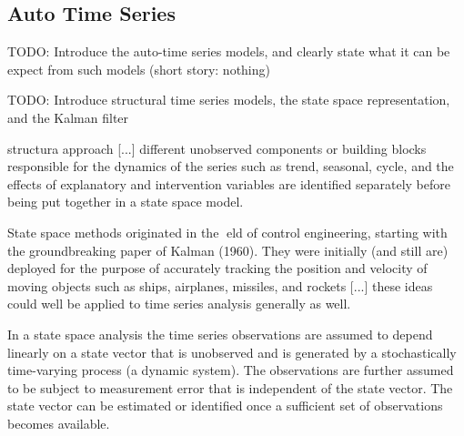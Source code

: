 
\subsection{Auto Time Series}

{\color{red} TODO: Introduce the auto-time series models, and clearly state what it can be expect from such models (short story: nothing)}

{\color{red} TODO: Introduce structural time series models, the state space representation, and the Kalman filter}

{\color{red} structura approach [...] different unobserved components or building blocks responsible for the dynamics of the series such as trend, seasonal, cycle, and the effects of explanatory and intervention variables are identified separately before being put together in a state space model.}

{\color{red} State space methods originated in the eld of control engineering, starting with the groundbreaking
paper of Kalman (1960). They were initially (and still are) deployed for the purpose
of accurately tracking the position and velocity of moving objects such as ships, airplanes,
missiles, and rockets [...] these ideas could well be applied to time series analysis
generally as well.}

{\color{red} In a state space
analysis the time series observations are assumed to depend linearly on a state vector that
is unobserved and is generated by a stochastically time-varying process (a dynamic system).
The observations are further assumed to be subject to measurement error that is independent
of the state vector. The state vector can be estimated or identified once a sufficient set of
observations becomes available.}

